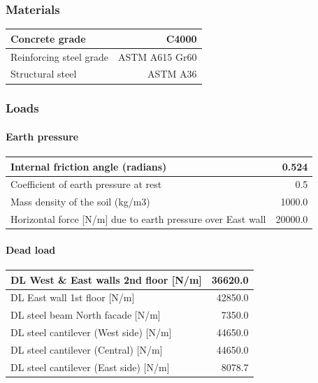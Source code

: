
\subsubsection{Materials}
\begin{center}
  \begin{tabular}{|l|r|}
\hline
Concrete grade & C4000 \\
\hline
Reinforcing steel grade & ASTM A615 Gr60  \\
\hline
Structural steel & ASTM A36 \\
\hline
\end{tabular}
\end{center}

\subsubsection{Loads}

\paragraph{Earth pressure}
\begin{center}
  \begin{tabular}{|l|r|}
\hline
Internal friction angle (radians) &  0.524 \\
\hline
Coefficient of earth pressure at rest  &  0.5 \\
\hline
Mass density of the soil (kg/m3)  &  1000.0 \\
\hline
Horizontal force [N/m] due to earth pressure over East wall &  20000.0 \\
\hline
\end{tabular}
\end{center}

\paragraph{Dead load}
\begin{center}
  \begin{tabular}{|l|r|}
\hline
DL West \& East walls 2nd floor [N/m] &  36620.0 \\
\hline
DL East wall 1st floor [N/m] &  42850.0 \\
\hline
DL steel beam North facade [N/m] &  7350.0 \\
\hline
DL steel cantilever (West side) [N/m]  &  44650.0 \\
\hline
DL steel cantilever (Central) [N/m]  &  44650.0 \\
\hline
DL steel cantilever  (East side) [N/m]  &  8078.7 \\
\hline
\end{tabular}
\end{center}

